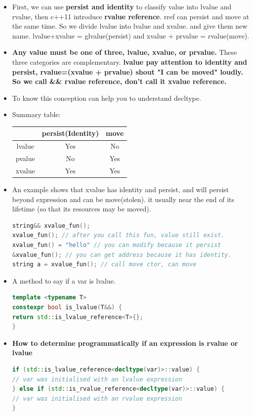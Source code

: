 \documentclass[a4paper,12pt,twoside]{book}
\begin{document}
\begin{itemize}
	\item First, we can use \textbf{persist and identity} to classify value into lvalue and rvalue, then c++11 introduce \textbf{rvalue reference}. rref can persist and move at the same time.  So we divide lvalue into lvalue and xvalue.  and give them new name.  lvalue+xvalue = glvalue(persist)  and xvalue + prvalue = rvalue(move).
	
	\item \textbf{Any value must be one of three, lvalue, xvalue, or prvalue.} These three categories are complementary.  \textbf{lvalue pay attention to  identity and persist, rvalue=(xvalue + prvalue) shout "I can be moved" loudly.  So we call \&\& rvalue reference, don't call it xvalue reference. }
	
	\item To know this conception can help you to understand decltype. 
	
	\item Summary table: \newline
	\begin{tabular}{|c|c|c|}
		\hline
		& persist(Identity) & move \\
		\hline
		lvalue & Yes & No \\
		\hline
		pvalue & No & Yes \\
		\hline
		xvalue & Yes & Yes \\
		\hline
	\end{tabular}

\item An example shows that xvalue has identity and persist, and will persist beyond expression and can be move(stolen). it usually near the end of its lifetime (so that its resources may be moved).
\begin{lstlisting}[frame=single, language=c++, mathescape=true]
string&& xvalue_fun();
xvalue_fun(); // after you call this fun, value still exist.
xvalue_fun() = "hello" // you can modify because it persist
&xvalue_fun(); // you can get address because it has identity.
string a = xvalue_fun(); // call move ctor, can move
\end{lstlisting}

\item A method to say if a var is lvalue.
\begin{lstlisting}[frame=single, language=c++]
template <typename T>
constexpr bool is_lvalue(T&&) {
return std::is_lvalue_reference<T>{};
}
\end{lstlisting}

\item \textbf{How to determine programmatically if an expression is rvalue or lvalue}
\begin{lstlisting}[frame=single, language=c++]
if (std::is_lvalue_reference<decltype(var)>::value) {
// var was initialised with an lvalue expression
} else if (std::is_rvalue_reference<decltype(var)>::value) {
// var was initialised with an rvalue expression
}
\end{lstlisting}

\end{itemize}
\end{document}
